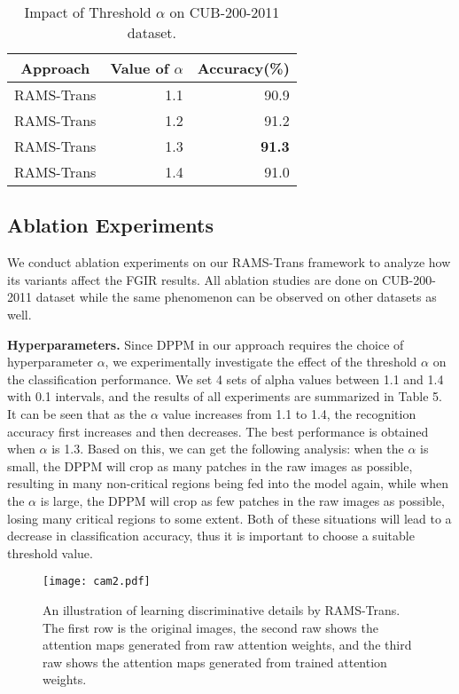 \documentclass[sigconf]{acmart}
\begin{document}
\begin{table}[h]
\caption{Impact of Threshold $\alpha$ on CUB-200-2011 dataset.}
\begin{center}
\begin{tabular}{c|rr}
\hline
Approach
&\multicolumn{1}{c}{Value of $\alpha$}
&\multicolumn{1}{c}{Accuracy(\%)}
\\
\hline
RAMS-Trans & 1.1 & 90.9\\
RAMS-Trans & 1.2 & 91.2\\
RAMS-Trans & 1.3 & \textbf{91.3}\\
RAMS-Trans & 1.4 & 91.0\\
\hline
\end{tabular}
\end{center}
\label{tab_base_model}
\end{table}

\subsection{Ablation Experiments}
We conduct ablation experiments on our RAMS-Trans framework to analyze how its variants affect the FGIR results. All ablation studies are done on CUB-200-2011 dataset while the same phenomenon can be observed on other datasets as well.

\textbf{Hyperparameters.} Since DPPM in our approach requires the choice of hyperparameter $\alpha$, we experimentally investigate the effect of the threshold $\alpha$ on the classification performance. We set 4 sets of alpha values between 1.1 and 1.4 with 0.1 intervals, and the results of all experiments are summarized in Table 5. It can be seen that as the $\alpha$ value increases from 1.1 to 1.4, the recognition accuracy first increases and then decreases. The best performance is obtained when $\alpha$ is 1.3. Based on this, we can get the following analysis: when the $\alpha$ is small, the DPPM will crop as many patches in the raw images as possible, resulting in many non-critical regions being fed into the model again, while when the $\alpha$ is large, the DPPM will crop as few patches in the raw images as possible, losing many critical regions to some extent. Both of these situations will lead to a decrease in classification accuracy, thus it is important to choose a suitable threshold value.

\begin{figure}[h]
\centering
\texttt{[image: cam2.pdf]}
\caption{An illustration of learning discriminative details by RAMS-Trans. The first row is the original images, the second raw shows the attention maps generated from raw attention weights, and the third raw shows the attention maps generated from trained attention weights.}
\end{figure}
\end{document}
